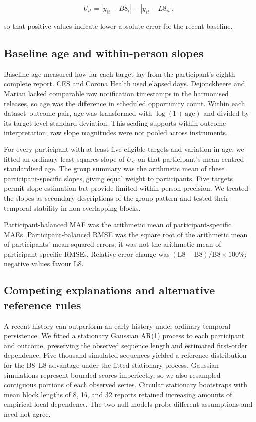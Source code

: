 \documentclass[pdflatex,sn-vancouver-num]{sn-jnl}
\begin{document}
\begin{equation}
U_{it}=|y_{it}-B8_i|-|y_{it}-L8_{it}|,
\label{eq:update}
\end{equation}

so that positive values indicate lower absolute error for the recent baseline.

\subsection{Baseline age and within-person slopes}

Baseline age measured how far each target lay from the participant's eighth complete report. CES and Corona Health used elapsed days. Dejonckheere and Marian lacked comparable raw notification timestamps in the harmonised releases, so age was the difference in scheduled opportunity count. Within each dataset--outcome pair, age was transformed with $\log(1+\mathrm{age})$ and divided by its target-level standard deviation. This scaling supports within-outcome interpretation; raw slope magnitudes were not pooled across instruments.

For every participant with at least five eligible targets and variation in age, we fitted an ordinary least-squares slope of $U_{it}$ on that participant's mean-centred standardised age. The group summary was the arithmetic mean of these participant-specific slopes, giving equal weight to participants. Five targets permit slope estimation but provide limited within-person precision. We treated the slopes as secondary descriptions of the group pattern and tested their temporal stability in non-overlapping blocks.

Participant-balanced MAE was the arithmetic mean of participant-specific MAEs. Participant-balanced RMSE was the square root of the arithmetic mean of participants' mean squared errors; it was not the arithmetic mean of participant-specific RMSEs. Relative error change was $(\mathrm{L8}-\mathrm{B8})/\mathrm{B8}\times100\%$; negative values favour L8.

\subsection{Competing explanations and alternative reference rules}

A recent history can outperform an early history under ordinary temporal persistence. We fitted a stationary Gaussian AR(1) process to each participant and outcome, preserving the observed sequence length and estimated first-order dependence. Five thousand simulated sequences yielded a reference distribution for the B8--L8 advantage under the fitted stationary process. Gaussian simulations represent bounded scores imperfectly, so we also resampled contiguous portions of each observed series. Circular stationary bootstraps with mean block lengths of 8, 16, and 32 reports retained increasing amounts of empirical local dependence. The two null models probe different assumptions and need not agree.
\end{document}
